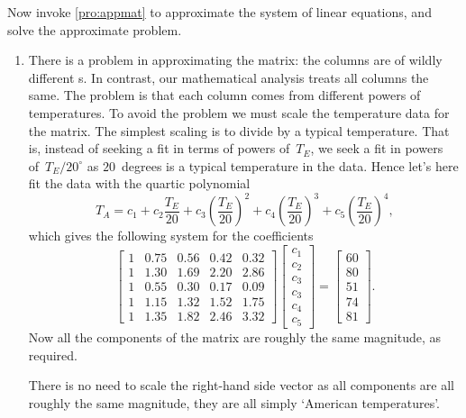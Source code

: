 \begin{example}
\begin{solution}
Now invoke \cref{pro:appmat} to approximate the system of linear equations, and solve the approximate problem.
\begin{enumerate}
\item
There is a problem in approximating the matrix: the columns are of wildly different s.  
In contrast, our mathematical analysis treats all columns the same.  
The problem is that each column comes from different powers of temperatures.  
To avoid the problem we must scale the temperature data for the matrix.  
The simplest scaling is to divide by a typical temperature.
That is, instead of seeking a fit in terms of powers of~\(T_E\), we seek a fit in powers of~\(T_E/20^\circ\) as \(20\)~degrees is a typical temperature in the data.
Hence let's here fit the data with the quartic polynomial
\begin{equation*}
T_A=c_1+c_2\frac{T_E}{20} +c_3\left(\frac{T_E}{20}\right)^2+c_4\left(\frac{T_E}{20}\right)^3+c_5\left(\frac{T_E}{20}\right)^4,
\end{equation*}
which gives the following system for the coefficients \twodp
\begin{equation*}
\begin{bmatrix} 1&0.75&0.56&0.42&0.32
\\1&1.30&1.69&2.20&2.86
\\1&0.55&0.30&0.17&0.09
\\1&1.15&1.32&1.52&1.75
\\1&1.35&1.82&2.46&3.32 \end{bmatrix}
\begin{bmatrix} c_1\\c_2\\c_3\\c_3\\c_4\\c_5 \end{bmatrix}
=\begin{bmatrix} 60\\80\\51\\74\\81 \end{bmatrix}.
\end{equation*}
Now all the components of the matrix are roughly the same magnitude, as required.

There is no need to scale the right-hand side vector as all components are all roughly the same magnitude, they are all simply `American temperatures'. 


\end{enumerate}
\end{solution}
\end{example}
